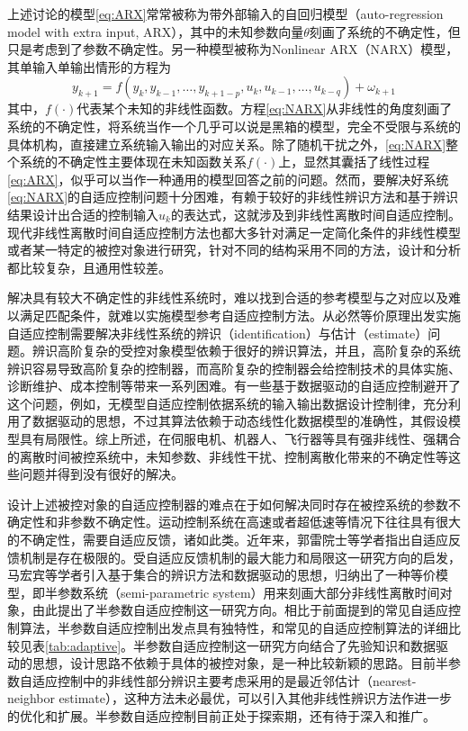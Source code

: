 上述讨论的模型\eqref{eq:ARX}常常被称为带外部输入的自回归模型（auto-regression model with extra input, ARX），其中的未知参数向量$\theta$刻画了系统的不确定性，但只是考虑到了参数不确定性。另一种模型被称为Nonlinear ARX（NARX）模型，其单输入单输出情形的方程为
\begin{equation}%
\label{eq:NARX}
y_{k+1} = f(y_{k},y_{k-1},\ldots,y_{k+1-p},u_{k},u_{k-1},\ldots,u_{k-q})+\omega_{k+1}
\end{equation}
其中，$f(\cdot)$代表某个未知的非线性函数。方程\eqref{eq:NARX}从非线性的角度刻画了系统的不确定性，将系统当作一个几乎可以说是黑箱的模型，完全不受限与系统的具体机构，直接建立系统输入输出的对应关系。除了随机干扰之外，\eqref{eq:NARX}整个系统的不确定性主要体现在未知函数关系$f(\cdot)$上，显然其囊括了线性过程\eqref{eq:ARX}，似乎可以当作一种通用的模型回答之前的问题。然而，要解决好系统\eqref{eq:NARX}的自适应控制问题十分困难，有赖于较好的非线性辨识方法和基于辨识结果设计出合适的控制输入$u_{k}$的表达式，这就涉及到非线性离散时间自适应控制。现代非线性离散时间自适应控制方法也都大多针对满足一定简化条件的非线性模型或者某一特定的被控对象进行研究，针对不同的结构采用不同的方法，设计和分析都比较复杂，且通用性较差。

解决具有较大不确定性的非线性系统时，难以找到合适的参考模型与之对应以及难以满足匹配条件，就难以实施模型参考自适应控制方法。从必然等价原理出发实施自适应控制需要解决非线性系统的辨识（identification）与估计（estimate）问题。辨识高阶复杂的受控对象模型依赖于很好的辨识算法，并且，高阶复杂的系统辨识容易导致高阶复杂的控制器，而高阶复杂的控制器会给控制技术的具体实施、诊断维护、成本控制等带来一系列困难。有一些基于数据驱动的自适应控制避开了这个问题，例如，无模型自适应控制依据系统的输入输出数据设计控制律，充分利用了数据驱动的思想，不过其算法依赖于动态线性化数据模型的准确性，其假设模型具有局限性。综上所述，在伺服电机、机器人、飞行器等具有强非线性、强耦合的离散时间被控系统中，未知参数、非线性干扰、控制离散化带来的不确定性等这些问题并得到没有很好的解决。

设计上述被控对象的自适应控制器的难点在于如何解决同时存在被控系统的参数不确定性和非参数不确定性。运动控制系统在高速或者超低速等情况下往往具有很大的不确定性，需要自适应反馈，诸如此类。近年来，郭雷院士等学者指出自适应反馈机制是存在极限的。受自适应反馈机制的最大能力和局限这一研究方向的启发，马宏宾等学者引入基于集合的辨识方法和数据驱动的思想，归纳出了一种等价模型，即半参数系统（semi-parametric system）用来刻画大部分非线性离散时间对象，由此提出了半参数自适应控制这一研究方向。相比于前面提到的常见自适应控制算法，半参数自适应控制出发点具有独特性，和常见的自适应控制算法的详细比较见表\eqref{tab:adaptive}。半参数自适应控制这一研究方向结合了先验知识和数据驱动的思想，设计思路不依赖于具体的被控对象，是一种比较新颖的思路。目前半参数自适应控制中的非线性部分辨识主要考虑采用的是最近邻估计（nearest-neighbor estimate），这种方法未必最优，可以引入其他非线性辨识方法作进一步的优化和扩展。半参数自适应控制目前正处于探索期，还有待于深入和推广。

